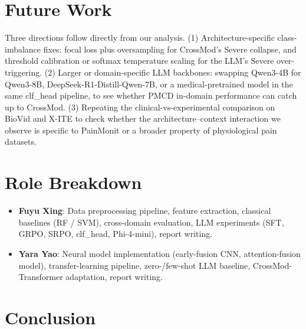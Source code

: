 \documentclass{article}
\begin{document}
\section{Future Work}

Three directions follow directly from our analysis. (1) Architecture-specific class-imbalance fixes: focal loss plus oversampling for CrossMod's Severe collapse, and threshold calibration or softmax temperature scaling for the LLM's Severe over-triggering. (2) Larger or domain-specific LLM backbones: swapping Qwen3-4B for Qwen3-8B, DeepSeek-R1-Distill-Qwen-7B, or a medical-pretrained model in the same clf\_head pipeline, to see whether PMCD in-domain performance can catch up to CrossMod. (3) Repeating the clinical-vs-experimental comparison on BioVid and X-ITE to check whether the architecture--context interaction we observe is specific to PainMonit or a broader property of physiological pain datasets.

\section{Role Breakdown}

\begin{itemize}[leftmargin=*]
    \item \textbf{Fuyu Xing}: Data preprocessing pipeline, feature extraction, classical baselines (RF / SVM), cross-domain evaluation, LLM experiments (SFT, GRPO, SRPO, clf\_head, Phi-4-mini), report writing.
    \item \textbf{Yara Yao}: Neural model implementation (early-fusion CNN, attention-fusion model), transfer-learning pipeline, zero-/few-shot LLM baseline, CrossMod-Transformer adaptation, report writing.
\end{itemize}

\section{Conclusion}
\end{document}
